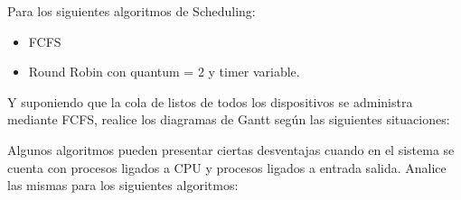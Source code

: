 \begin{questions}
Para los siguientes algoritmos de Scheduling:
\begin{itemize}
	\item FCFS
	\item Round Robin con quantum = 2 y timer variable.
\end{itemize}

Y suponiendo que la cola de listos de todos los dispositivos se administra mediante FCFS, realice los diagramas de Gantt según las siguientes situaciones:

\question Algunos algoritmos pueden presentar ciertas desventajas cuando en el sistema se cuenta con procesos ligados a CPU y procesos ligados a entrada salida. Analice las mismas para los siguientes algoritmos: \label{ventajas_desventajas_proc_ligadura}
\begin{parts}

\end{parts}
\end{questions}

